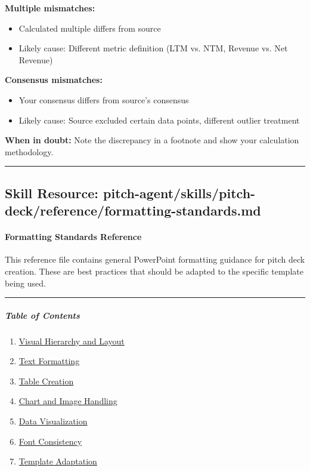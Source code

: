 \documentclass[11pt]{article}
\begin{document}
\textbf{Multiple mismatches:}

\begin{itemize}[leftmargin=*,itemsep=2pt,topsep=2pt]
\item {} Calculated multiple differs from source
\item {} Likely cause: Different metric definition (LTM vs. NTM, Revenue vs. Net Revenue)
\end{itemize}

\textbf{Consensus mismatches:}

\begin{itemize}[leftmargin=*,itemsep=2pt,topsep=2pt]
\item {} Your consensus differs from source's consensus
\item {} Likely cause: Source excluded certain data points, different outlier treatment
\end{itemize}

\textbf{When in doubt:} Note the discrepancy in a footnote and show your calculation methodology.


\vspace{0.8em}\hrule\vspace{0.8em}

\subsection{Skill Resource: pitch-agent/skills/pitch-deck/reference/formatting-standards.md}\label{file:pitch-agent-skills-pitch-deck-reference-formatting-standards-md}

\paragraph{Formatting Standards Reference}\mbox{}\par

This reference file contains general PowerPoint formatting guidance for pitch deck creation. These are best practices that should be adapted to the specific template being used.


\vspace{0.5em}\hrule\vspace{0.5em}

\subparagraph{Table of Contents}\mbox{}\par

\begin{enumerate}[leftmargin=*,itemsep=2pt,topsep=2pt]
\item {} \href{\#visual-hierarchy-and-layout}{Visual Hierarchy and Layout}
\item {} \href{\#text-formatting}{Text Formatting}
\item {} \href{\#table-creation}{Table Creation}
\item {} \href{\#chart-and-image-handling}{Chart and Image Handling}
\item {} \href{\#data-visualization}{Data Visualization}
\item {} \href{\#font-consistency}{Font Consistency}
\item {} \href{\#template-adaptation}{Template Adaptation}
\end{enumerate}
\end{document}
